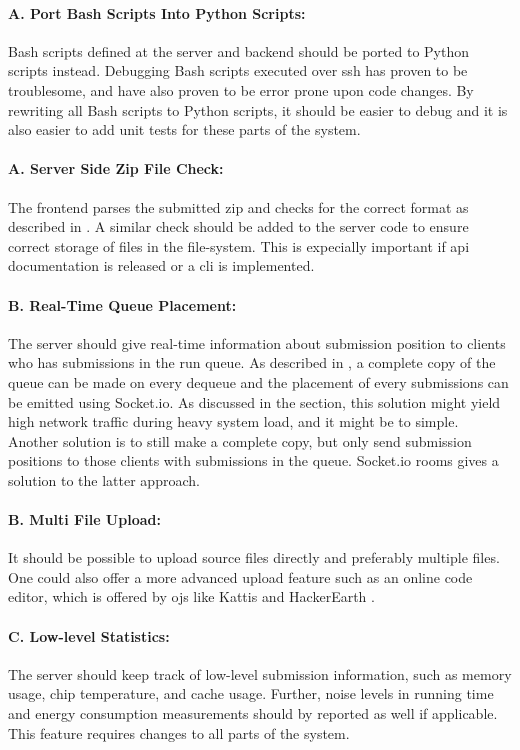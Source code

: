 \paragraph*{A. Port Bash Scripts Into Python Scripts:} Bash scripts defined at the server and backend should be ported to Python scripts instead. Debugging Bash scripts executed over \gls{ssh} has proven to be troublesome, and have also proven to be error prone upon code changes. By rewriting all Bash scripts to Python scripts, it should be easier to debug and it is also easier to add unit tests for these parts of the system.

\paragraph*{A. Server Side Zip File Check:} The frontend parses the submitted zip and checks for the correct format as described in . A similar check should be added to the server code to ensure correct storage of files in the file-system. This is expecially important if \gls{api} documentation is released or a \gls{cli} is implemented.

\paragraph*{B. Real-Time Queue Placement:} The server should give real-time information about submission position to clients who has submissions in the run queue. As described in , a complete copy of the queue can be made on every dequeue and the placement of every submissions can be emitted using Socket.io. As discussed in the section, this solution might yield high network traffic during heavy system load, and it might be to simple. Another solution is to still make a complete copy, but only send submission positions to those clients with submissions in the queue. Socket.io rooms gives a solution to the latter approach.

\paragraph*{B. Multi File Upload:} It should be possible to upload source files directly and preferably multiple files. One could also offer a more advanced upload feature such as an online code editor, which is offered by \glspl{oj} like Kattis \cite{KATTIS} and HackerEarth \cite{HACKEREARTH}. 

\paragraph*{C. Low-level Statistics:} The server should keep track of low-level submission information, such as memory usage, chip temperature, and cache usage. Further, noise levels in running time and energy consumption measurements should by reported as well if applicable. This feature requires changes to all parts of the system.

